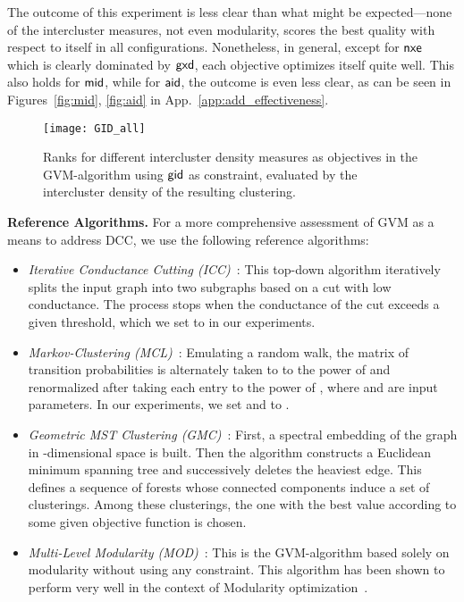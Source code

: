 \documentclass{llncs}
\newcommand{\measure}[1]{\ensuremath{\text{\normalfont{\sffamily {#1}}}}\xspace}
\newcommand{\andreapar}{\vspace*{.5ex}\par\noindent}
\begin{document}
The outcome of this experiment is less clear than what might be expected---none of the intercluster measures, not even modularity, scores the best quality with respect to itself in all configurations.
Nonetheless, in general, except for \measure{nxe} which is clearly dominated by \measure{gxd}, each objective optimizes itself quite well.
This also holds for \measure{mid}, while for \measure{aid}, the outcome is even less clear, as can be seen in Figures~\ref{fig:mid}, \ref{fig:aid} in App.~\ref{app:add_effectiveness}.
\begin{figure}[t]
 	\centerline{\texttt{[image: GID\_all]}}
	\vspace*{-1.5ex}
 	\caption{Ranks for different intercluster density measures as objectives in the GVM-algorithm using \measure{gid} as constraint, evaluated by the intercluster density of the resulting clustering.}
 	\label{fig:gid}
\end{figure}
\andreapar\textbf{Reference Algorithms.}
For a more comprehensive assessment of GVM as a means to address \textsc{DCC}, we use the following reference algorithms:
\vspace*{-0.5ex}
\begin{itemize}
    \item \emph{Iterative Conductance Cutting (ICC)}~\cite{kvv-cgds-00}:
    This top-down algorithm iteratively splits the input graph into two subgraphs based on a cut with low conductance.
    The process stops when the conductance of the cut exceeds a given threshold, which we set to  in our experiments.
	\item \emph{Markov-Clustering (MCL)}~\cite{phd-dongen-02}:
	Emulating a random walk, the matrix of transition probabilities is alternately taken to to the power of  and renormalized after taking each entry to the power of , where  and  are input parameters.
In our experiments, we set  and  to .
	\item \emph{Geometric MST Clustering (GMC)}~\cite{bgw-egca-03}: First, a spectral embedding of the graph in -dimensional space is built.
	Then the algorithm constructs a Euclidean minimum spanning tree and successively deletes the heaviest edge.
	This defines a sequence of forests whose connected components induce a set of clusterings.
	Among these clusterings, the one with the best value according to some given objective function is chosen.
	\item \emph{Multi-Level Modularity (MOD)}~\cite{rn-m-11}: This is the GVM-algorithm based solely on modularity without using any constraint. This algorithm has been shown to perform very well in the context of Modularity optimization~\cite{rn-m-11}.
\end{itemize}
\end{document}
